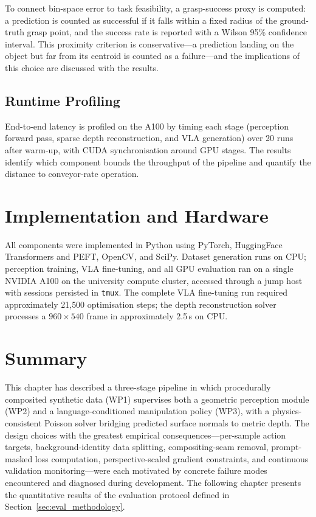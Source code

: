 To connect bin-space error to task feasibility, a grasp-success proxy is computed: a prediction is counted as successful if it falls within a fixed radius of the ground-truth grasp point, and the success rate is reported with a Wilson 95\% confidence interval. This proximity criterion is conservative---a prediction landing on the object but far from its centroid is counted as a failure---and the implications of this choice are discussed with the results.

\subsection{Runtime Profiling}
\label{subsec:runtime}

End-to-end latency is profiled on the A100 by timing each stage (perception forward pass, sparse depth reconstruction, and VLA generation) over 20 runs after warm-up, with CUDA synchronisation around GPU stages. The results identify which component bounds the throughput of the pipeline and quantify the distance to conveyor-rate operation.

\section{Implementation and Hardware}
\label{sec:implementation}

All components were implemented in Python using PyTorch, HuggingFace Transformers and PEFT, OpenCV, and SciPy. Dataset generation runs on CPU; perception training, VLA fine-tuning, and all GPU evaluation ran on a single NVIDIA A100 on the university compute cluster, accessed through a jump host with sessions persisted in \texttt{tmux}. The complete VLA fine-tuning run required approximately 21{,}500 optimisation steps; the depth reconstruction solver processes a $960 \times 540$ frame in approximately 2.5\,s on CPU.

\section{Summary}
\label{sec:method_summary}

This chapter has described a three-stage pipeline in which procedurally composited synthetic data (WP1) supervises both a geometric perception module (WP2) and a language-conditioned manipulation policy (WP3), with a physics-consistent Poisson solver bridging predicted surface normals to metric depth. The design choices with the greatest empirical consequences---per-sample action targets, background-identity data splitting, compositing-seam removal, prompt-masked loss computation, perspective-scaled gradient constraints, and continuous validation monitoring---were each motivated by concrete failure modes encountered and diagnosed during development. The following chapter presents the quantitative results of the evaluation protocol defined in Section~\ref{sec:eval_methodology}.